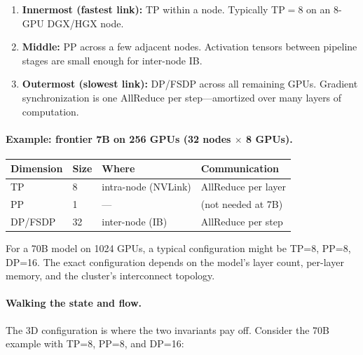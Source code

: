\begin{enumerate}[nosep]
  \item \textbf{Innermost (fastest link):} TP within a node. Typically TP$=$8 on an 8-GPU DGX/HGX node.
  \item \textbf{Middle:} PP across a few adjacent nodes. Activation tensors between pipeline stages are small enough for inter-node IB.
  \item \textbf{Outermost (slowest link):} DP/FSDP across all remaining GPUs. Gradient synchronization is one AllReduce per step---amortized over many layers of computation.
\end{enumerate}

\paragraph{Example: frontier 7B on 256 GPUs (32 nodes $\times$ 8 GPUs).}

\begin{center}
\begin{tabular}{@{}llll@{}}
\toprule
\textbf{Dimension} & \textbf{Size} & \textbf{Where} & \textbf{Communication} \\
\midrule
TP & 8 & intra-node (NVLink) & AllReduce per layer \\
PP & 1 & --- & (not needed at 7B) \\
DP/FSDP & 32 & inter-node (IB) & AllReduce per step \\
\bottomrule
\end{tabular}
\end{center}

For a 70B model on 1024 GPUs, a typical configuration might be TP=8, PP=8, DP=16. The exact configuration depends on the model's layer count, per-layer memory, and the cluster's interconnect topology.

\paragraph{Walking the state and flow.} The 3D configuration is where the two invariants pay off. Consider the 70B example with TP=8, PP=8, and DP=16:

